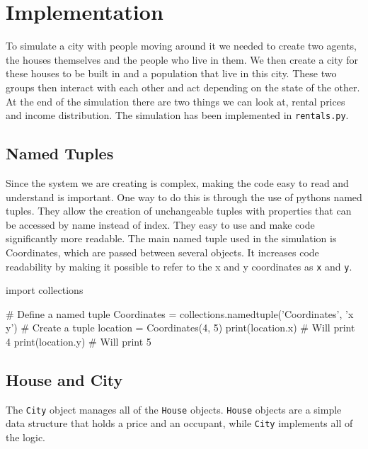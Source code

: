 \section{Implementation}

\par
To simulate a city with people moving around it we needed to create two agents, the houses themselves and the people who live in them. We then create a city for these houses to be built in and a population that live in this city. These two groups then interact with each other and act depending on the state of the other. At the end of the simulation there are two things we can look at, rental prices and income distribution. The simulation has been implemented in \texttt{rentals.py}.

\subsection{Named Tuples}

Since the system we are creating is complex, making the code easy to read and understand is important. One way to do this is through the use of pythons named tuples. They allow the creation of unchangeable tuples with properties that can be accessed by name instead of index. They easy to use and make code significantly more readable. The main named tuple used in the simulation is Coordinates, which are passed between several objects. It increases code readability by making it possible to refer to the x and y coordinates as \texttt{x} and \texttt{y}.
\\

\begin{code}[language=Python]
import collections

# Define a named tuple
Coordinates = collections.namedtuple('Coordinates', 'x y')
# Create a tuple
location = Coordinates(4, 5)
print(location.x) # Will print 4
print(location.y) # Will print 5
\end{code}

\subsection{House and City}

\par
The \texttt{City} object manages all of the \texttt{House} objects. \texttt{House} objects are a simple data structure that holds a price and an occupant, while \texttt{City} implements all of the logic.

